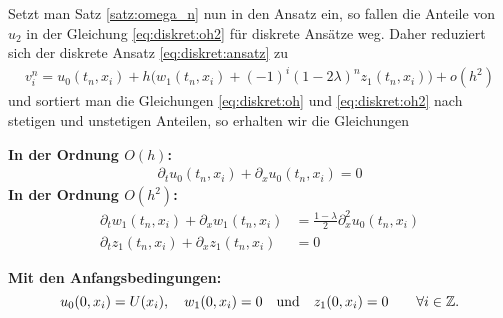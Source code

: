 Setzt man Satz \ref{satz:omega_n} nun in den Ansatz ein, so fallen die Anteile von $u_2$ in der Gleichung \eqref{eq:diskret:oh2} für diskrete Ansätze weg.
Daher reduziert sich der diskrete Ansatz \eqref{eq:diskret:ansatz} zu
\begin{align}\label{eq:osz:ansatz}
v^n_i = u_0(t_n, x_i) + h \bigl( w_1(t_n, x_i) + (-1)^i (1 - 2 \lambda)^n z_1(t_n, x_i) \bigr) + o(h^2)
\end{align}
und sortiert man die Gleichungen \eqref{eq:diskret:oh} und \eqref{eq:diskret:oh2} nach stetigen und unstetigen Anteilen, so erhalten wir die Gleichungen

\vspace{0.4cm}
\noindent \textbf{In der Ordnung $O(h)$:}
\begin{align}\label{eq:osz:oh}
\partial_t u_0(t_n, x_i) + \partial_x u_0(t_n, x_i) = 0
\end{align}
\vspace{0.4cm}
\noindent \textbf{In der Ordnung $O(h^2)$:}
\begin{align}\label{eq:osz:oh2}
\partial_t w_1(t_n, x_i) + \partial_x w_1(t_n, x_i) &= \frac {1 - \lambda}{2} \partial^2_x u_0(t_n, x_i)\\
\partial_t z_1(t_n, x_i) + \partial_x z_1(t_n, x_i) &= 0
\end{align}

\vspace{0.4cm}
\noindent \textbf{Mit den Anfangsbedingungen:}
\[ u_0(0, x_i) = U(x_i), \quad w_1(0, x_i) = 0 \quad \text{und} \quad z_1(0, x_i) = 0 \qquad \forall i \in \mathbb Z. \]

